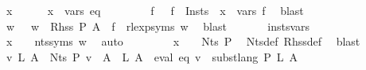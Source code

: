 \begin{isabellebody}
\ x\isanewline
\ \ \ \ \isamarkupfalse%
\ {\isachardoublequoteopen}x\ {\isasymin}\ vars\ eq{\isachardoublequoteclose}\isanewline
\ \ \ \ \isamarkupfalse%
\ {\isacharasterisk}{\kern0pt}\ \isamarkupfalse%
\ f\ \ {\isacharasterisk}{\kern0pt}{\isacharasterisk}{\kern0pt}{\isacharcolon}{\kern0pt}\ {\isachardoublequoteopen}f\ {\isasymin}\ {\isacharquery}{\kern0pt}Insts\ {\isasymand}\ x\ {\isasymin}\ vars\ f{\isachardoublequoteclose}\ \isamarkupfalse%
\ blast\isanewline
\ \ \ \ \isamarkupfalse%
\ \isamarkupfalse%
\ w\ \ {\isacharasterisk}{\kern0pt}{\isacharasterisk}{\kern0pt}{\isacharasterisk}{\kern0pt}{\isacharcolon}{\kern0pt}\ {\isachardoublequoteopen}w\ {\isasymin}\ Rhss\ P\ A\ {\isasymand}\ f\ {\isacharequal}{\kern0pt}\ rlexp{\isacharunderscore}{\kern0pt}syms\ w{\isachardoublequoteclose}\ \isamarkupfalse%
\ blast\isanewline
\ \ \ \ \isamarkupfalse%
\ {\isacharasterisk}{\kern0pt}{\isacharasterisk}{\kern0pt}\ insts{\isacharprime}{\kern0pt}{\isacharunderscore}{\kern0pt}vars\ \isamarkupfalse%
\ {\isachardoublequoteopen}x\ {\isasymin}\ {\isasymgamma}{\isacharprime}{\kern0pt}\ {\isacharbackquote}{\kern0pt}\ nts{\isacharunderscore}{\kern0pt}syms\ w{\isachardoublequoteclose}\ \isamarkupfalse%
\ auto\isanewline
\ \ \ \ \isamarkupfalse%
\ {\isacharasterisk}{\kern0pt}{\isacharasterisk}{\kern0pt}{\isacharasterisk}{\kern0pt}\ \isamarkupfalse%
\ {\isachardoublequoteopen}x\ {\isasymin}\ {\isasymgamma}{\isacharprime}{\kern0pt}\ {\isacharbackquote}{\kern0pt}\ Nts\ P{\isachardoublequoteclose}\ \isamarkupfalse%
\ Nts{\isacharunderscore}{\kern0pt}def\ Rhss{\isacharunderscore}{\kern0pt}def\ \isamarkupfalse%
\ blast\isanewline
\ \ \isamarkupfalse%
\isanewline
\ \ \isamarkupfalse%
\ \isamarkupfalse%
\ {\isachardoublequoteopen}{\isasymforall}v\ L{\isachardot}{\kern0pt}\ {\isacharparenleft}{\kern0pt}{\isasymforall}A\ {\isasymin}\ Nts\ P{\isachardot}{\kern0pt}\ v\ {\isacharparenleft}{\kern0pt}{\isasymgamma}{\isacharprime}{\kern0pt}\ A{\isacharparenright}{\kern0pt}\ {\isacharequal}{\kern0pt}\ L\ A{\isacharparenright}{\kern0pt}\ {\isasymlongrightarrow}\ eval\ eq\ v\ {\isacharequal}{\kern0pt}\ subst{\isacharunderscore}{\kern0pt}lang\ P\ L\ A{\isachardoublequoteclose}\isanewline
\ \ \isamarkupfalse%

\end{isabellebody}
